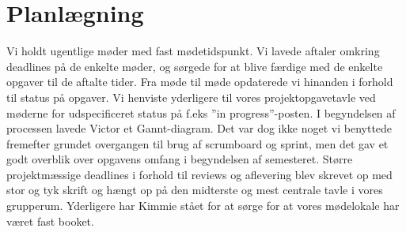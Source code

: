 \section{Planlægning}

Vi holdt ugentlige møder med fast mødetidspunkt. Vi lavede aftaler omkring deadlines på de enkelte møder, og sørgede for at blive færdige med de enkelte opgaver til de aftalte tider. Fra møde til møde opdaterede vi hinanden i forhold til status på opgaver. Vi henviste yderligere til vores projektopgavetavle ved møderne for udspecificeret status på f.eks ”in progress”-posten.  
 I begyndelsen af processen lavede Victor et Gannt-diagram. Det var dog ikke noget vi benyttede fremefter grundet overgangen til brug af scrumboard og sprint, men det gav et godt overblik over opgavens omfang i begyndelsen af semesteret. 
Større projektmæssige deadlines i forhold til reviews og aflevering blev skrevet op med stor og tyk skrift og hængt op på den midterste og mest centrale tavle i vores grupperum. 
Yderligere har Kimmie stået for at sørge for at vores mødelokale har været fast booket.